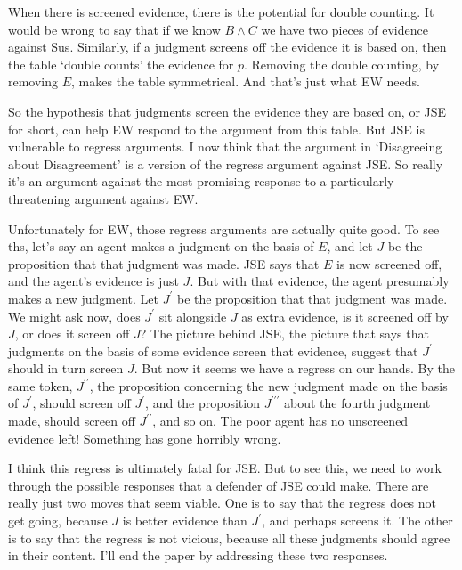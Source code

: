 When there is screened evidence, there is the potential for double counting. It would be wrong to say that if we know $B \wedge C$ we have two pieces of evidence against Sus. Similarly, if a judgment screens off the evidence it is based on, then the table `double counts' the evidence for $p$. Removing the double counting, by removing $E$, makes the table symmetrical. And that's just what EW needs.

So the hypothesis that judgments screen the evidence they are based on, or JSE for short, can help EW respond to the argument from this table. But JSE is vulnerable to regress arguments. I now think that the argument in `Disagreeing about Disagreement' is a version of the regress argument against JSE. So really it's an argument against the most promising response to a particularly threatening argument against EW.

Unfortunately for EW, those regress arguments are actually quite good. To see ths, let's say an agent makes a judgment on the basis of \(E\), and let \(J\) be the proposition that that judgment was made. JSE says that \(E\) is now screened off, and the agent's evidence is just \(J\). But with that evidence, the agent presumably makes a new judgment. Let \(J^\prime\) be the proposition that that judgment was made. We might ask now, does \(J^\prime\) sit alongside \(J\) as extra evidence, is it screened off by \(J\), or does it screen off \(J\)? The picture behind JSE, the picture that says that judgments on the basis of some evidence screen that evidence, suggest that \(J^\prime\) should in turn screen \(J\). But now it seems we have a regress on our hands. By the same token, \(J^{\prime \prime}\), the proposition concerning the new judgment made on the basis of \(J^\prime\), should screen off \(J^\prime\), and the proposition \(J^{\prime \prime \prime}\) about the fourth judgment made, should screen off \(J^{\prime \prime}\), and so on. The poor agent has no unscreened evidence left! Something has gone horribly wrong.

I think this regress is ultimately fatal for JSE. But to see this, we need to work through the possible responses that a defender of JSE could make. There are really just two moves that seem viable. One is to say that the regress does not get going, because \(J\) is better evidence than \(J^\prime\), and perhaps screens it. The other is to say that the regress is not vicious, because all these judgments should agree in their content.  I'll end the paper by addressing these two responses.

